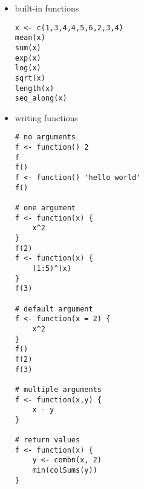 \documentclass[a4paper,12pt]{article}
\begin{document}
\begin{itemize}

\item built-in functions

\begin{lstlisting}
x <- c(1,3,4,4,5,6,2,3,4)
mean(x)
sum(x)
exp(x)
log(x)
sqrt(x)
length(x)
seq_along(x)
\end{lstlisting}

\item writing functions


\begin{lstlisting}
# no arguments
f <- function() 2
f
f()
f <- function() 'hello world'
f()

# one argument
f <- function(x) {
    x^2
}
f(2)
f <- function(x) {
    (1:5)^(x)
}
f(3)

# default argument
f <- function(x = 2) {
    x^2
}
f()
f(2)
f(3)

# multiple arguments
f <- function(x,y) {
    x - y
}

# return values
f <- function(x) {
    y <- combn(x, 2)
    min(colSums(y))
}

\end{lstlisting}



\end{itemize}
\end{document}

